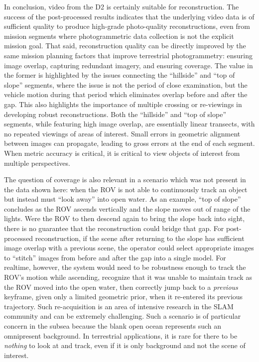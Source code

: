 \documentclass[letterpaper,12pt]{article}
\begin{document}
In conclusion, video from the D2 is certainly suitable for reconstruction.   The success of the post-processed results indicates that the underlying video data is of sufficient quality to produce high-grade photo-quality reconstructions, even from mission segments where photogrammetric data collection is not the explicit mission goal.   That said, reconstruction quality can be directly improved by the same mission planning factors that improve terrestrial photogrammetry:   ensuring image overlap, capturing redundant imagery, and ensuring coverage.   The value in the former is highlighted by the issues connecting the ``hillside'' and ``top of slope'' segments, where the issue is not the period of close examination, but the vehicle motion during that period which eliminates overlap before and after the gap.   This also highlights the importance of multiple crossing or re-viewings in developing robust reconstructions.   Both the ``hillside'' and ``top of slope'' segments, while featuring high image overlap, are essentially linear transects, with no repeated viewings of areas of interest.   Small errors in geometric alignment between images can propagate, leading to gross errors at the end of each segment.   When metric accuracy is critical, it is critical to view objects of interest from multiple perspectives.   

The question of coverage is also relevant in a scenario which was not present in the data shown here: when the ROV is not able to continuously track an object but instead must ``look away'' into open water.  As an example, ``top of slope'' concludes as the ROV ascends vertically and the slope moves out of range of the lights.     Were the ROV to then descend again to bring the slope back into sight, there is no guarantee that the reconstruction could bridge that gap.   For post-processed reconstruction, if the scene after returning to the slope has sufficient image overlap with a previous scene, the operator could select appropriate images to ``stitch'' images from before and after the gap into a single model.    For realtime, however, the system would need to be robustness enough to track the ROV's motion while ascending, recognize that it was unable to maintain track as the ROV moved into the open water, then correctly jump back to a \textit{previous} keyframe, given only a limited geometric prior, when it re-entered its previous trajectory.  Such re-acquisition is an area of intensive research in the SLAM community and can be extremely challenging.    Such a scenario is of particular concern in the subsea because the blank open ocean represents such an omnipresent background.   In terrestrial applications, it is rare for there to be \textit{nothing} to look at and track, even if it is only background and not the scene of interest.
\end{document}
